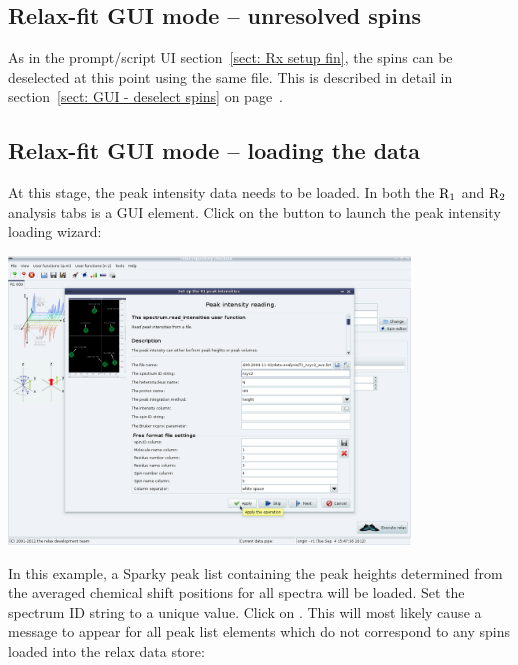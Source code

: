 
\subsection{Relax-fit GUI mode -- unresolved spins}

As in the prompt/script UI section~\ref{sect: Rx setup fin}, the spins can be deselected at this point using the same  file.  This is described in detail in section~\ref{sect: GUI - deselect spins} on page~\pageref{sect: GUI - deselect spins}.




\subsection{Relax-fit GUI mode -- loading the data}

At this stage, the peak intensity data needs to be loaded.  In both the $\mathrm{R}_1$ and $\mathrm{R}_2$ analysis tabs is a  GUI element.  Click on the  button to launch the peak intensity loading wizard:

\begin{minipage}[h]{\linewidth}
\centerline{\includegraphics[width=0.8\textwidth, bb=14 14 1415 1019]{graphics/screenshots/r1_analysis/peak_intensity_bb_peaks}}
\end{minipage}

In this example, a Sparky peak list containing the peak heights determined from the averaged chemical shift positions for all spectra will be loaded.  Set the spectrum ID string to a unique value.
Click on .
This will most likely cause a  message to appear for all peak list elements which do not correspond to any spins loaded into the relax data store:

